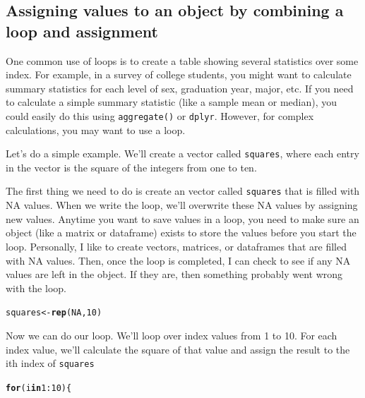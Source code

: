 \documentclass{tufte-book}\usepackage[]{graphicx}\usepackage[]{color}
\makeatletter
\newcommand{\hlnum}[1]{\textcolor[rgb]{0.686,0.059,0.569}{#1}}%
\newcommand{\hlopt}[1]{\textcolor[rgb]{0,0,0}{#1}}%
\newcommand{\hlstd}[1]{\textcolor[rgb]{0.345,0.345,0.345}{#1}}%
\newcommand{\hlkwa}[1]{\textcolor[rgb]{0.161,0.373,0.58}{\textbf{#1}}}%
\newcommand{\hlkwb}[1]{\textcolor[rgb]{0.69,0.353,0.396}{#1}}%
\newcommand{\hlkwd}[1]{\textcolor[rgb]{0.737,0.353,0.396}{\textbf{#1}}}%
\newenvironment{kframe}{%
 \def\at@end@of@kframe{}%
 \ifinner\ifhmode%
  \def\at@end@of@kframe{\end{minipage}}%
  \begin{minipage}{\columnwidth}%
 \fi\fi%
 \def\FrameCommand##1{\hskip\@totalleftmargin \hskip-\fboxsep
 \colorbox{shadecolor}{##1}\hskip-\fboxsep
     \hskip-\linewidth \hskip-\@totalleftmargin \hskip\columnwidth}%
 \MakeFramed {\advance\hsize-\width
   \@totalleftmargin\z@ \linewidth\hsize
   \@setminipage}}%
 {\par\unskip\endMakeFramed%
 \at@end@of@kframe}
\newenvironment{knitrout}{}{} %
\makeatother
\begin{document}
\begin{footnotesize}
\section{Assigning values to an object by combining a loop and assignment}

One common use of loops is to create a table showing several statistics over some index. For example, in a survey of college students, you might want to calculate summary statistics for each level of sex, graduation year, major, etc. If you need to calculate a simple summary statistic (like a sample mean or median), you could easily do this using \texttt{aggregate()} or \texttt{dplyr}. However, for complex calculations, you may want to use a loop.

Let's do a simple example. We'll create a vector called \texttt{squares}, where each entry in the vector is the square of the integers from one to ten.

The first thing we need to do is create an vector called \texttt{squares} that is filled with NA values. When we write the loop, we'll overwrite these NA values by assigning new values. Anytime you want to save values in a loop, you need to make sure an object (like a matrix or dataframe) exists to store the values before you start the loop. Personally, I like to create vectors, matrices, or dataframes that are filled with NA values. Then, once the loop is completed, I can check to see if any NA values are left in the object. If they are, then something probably went wrong with the loop.

\begin{knitrout}
\color{fgcolor}\begin{kframe}
\begin{alltt}
\hlstd{squares} \hlkwb{<-} \hlkwd{rep}\hlstd{(}\hlnum{NA}\hlstd{,} \hlnum{10}\hlstd{)}
\end{alltt}
\end{kframe}
\end{knitrout}

Now we can do our loop. We'll loop over index values from 1 to 10. For each index value, we'll calculate the square of that value and assign the result to the ith index of \texttt{squares}

\begin{knitrout}
\color{fgcolor}\begin{kframe}
\begin{alltt}
\hlkwa{for}\hlstd{(i} \hlkwa{in} \hlnum{1}\hlopt{:}\hlnum{10}\hlstd{) \{}


\end{alltt}
\end{kframe}
\end{knitrout}
\end{footnotesize}
\end{document}
